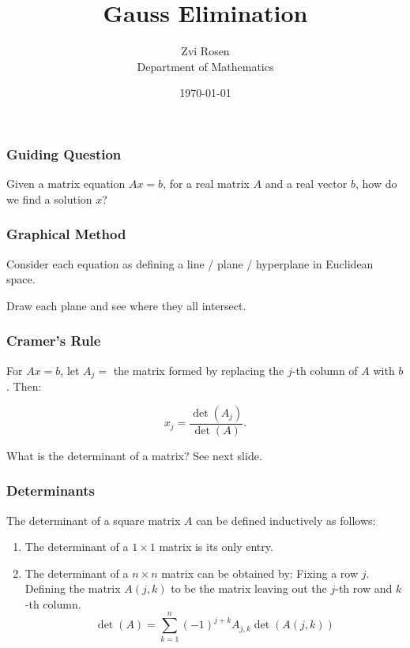 \documentclass[12pt]{beamer}
\theoremstyle{definition}
\begin{document}
\author[Z. Rosen]{Zvi Rosen \\ Department of Mathematics}

\date[\today]{\today}
\title[Gauss Elimination]{{\Large Gauss Elimination}}


\frame{\titlepage}


\begin{frame}
\frametitle{Guiding Question}

Given a matrix equation $Ax = b$, for a real matrix $A$ and a
real vector $b$, how do we find a solution $x$?
\end{frame}
\begin{frame}
\frametitle{Graphical Method}

Consider each equation as defining a line / plane / hyperplane
in Euclidean space.

\vspace{1cm}
Draw each plane and see where they all intersect.
\end{frame}

\begin{frame}
\frametitle{Cramer's Rule}

For $Ax = b$, let $A_j =$ the matrix formed by replacing
the $j$-th column of $A$ with $b$. Then:

\[ x_j = \frac{\operatorname{det}(A_j)}{\operatorname{det}(A)}.\]

What is the determinant of a matrix? See next slide.
\end{frame}

\begin{frame}
\frametitle{Determinants}

The determinant of a square matrix $A$ can be defined inductively
as follows:
\begin{enumerate}
\item The determinant of a $1 \times 1$ matrix is its only entry.
\item The determinant of a $n \times n$ matrix can be obtained by:
Fixing a row $j$. Defining the matrix $A({j,k})$ to be the matrix
leaving out the $j$-th row and $k$-th column. 
\[ \det(A) = \sum_{k = 1}^n (-1)^{j+k}A_{j,k}\det(A(j,k))
\]

\end{enumerate}
\end{frame}
\end{document}
